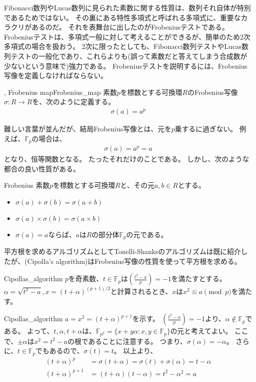 Fibonacci数列やLucas数列に見られた素数に関する性質は、数列それ自体が特別であるためではない。
その裏にある特性多項式と呼ばれる多項式に、重要なカラクリがあるのだ。
それを表舞台に出したのがFrobeniusテストである。
Frobeniusテストは、多項式一般に対して考えることができるが、簡単のため2次多項式の場合を扱おう。
2次に限ったとしても、Fibonacci数列テストやLucas数列テストの一般化であり、これらよりも(誤って素数だと答えてしまう合成数が少ないという意味で)強力である。
Frobeniusテストを説明するには、Frobenius写像を定義しなければならない。

\begin{Defi}{, Frobenius map}{Frobenius_map}
素数$p$を標数とする可換環$R$のFrobenius写像$\sigma:R\to R$を、次のように定義する。
\begin{align*}
\sigma(a) = a^p
\end{align*}
\end{Defi}

難しい言葉が並んだが、結局Frobenius写像とは、元を$p$乗するに過ぎない。
例えば、$\mathbb{F}_p$の場合は、
\begin{align*}
\sigma(a) = a^p = a
\end{align*}
となり、恒等関数となる。
たったそれだけのことである。
しかし、次のような都合の良い性質がある。

\begin{Prop}{}{Frobenius}
素数$p$を標数とする可換環$R$と、その元$a,b\in R$とする。
\begin{itemize}
\item $\sigma(a) + \sigma(b) = \sigma(a + b)$
\item $\sigma(a) \times \sigma(b) = \sigma(a \times b)$
\item $\sigma(a) = a$ならば、$a$は$R$の部分体$\mathbb{F}_p$の元である。
\end{itemize}
\end{Prop}

平方根を求めるアルゴリズムとしてTonelli-Shanksのアルゴリズムは既に紹介したが、(Cipolla's algorithm)はFrobenius写像の性質を使って平方根を求める。

\begin{Prop}{}{Cipollas_algorithm}
$p$を奇素数、$t\in\mathbb{F}_p$は$\left(\frac{t^2-a}{p}\right)=-1$を満たすとする。
$\alpha=\sqrt{t^2-a}, x=(t+\alpha)^{(p+1)/2}$と計算されるとき、$x$は$x^2 \equiv a\pmod{p}$を満たす。
\end{Prop}

\begin{prProof}{Cipollas_algorithm}
$a=x^2=(t+\alpha)^{p+1}$を示す。
$\left(\frac{t^2-a}{p}\right)=-1$より、$\alpha\not\in\mathbb{F}_p$である。
よって、$t,\alpha,t+\alpha$は、$\mathbb{F}_{p^2}=\{x+y\alpha : x,y \in\mathbb{F}_p\}$の元と考えてよい。
ここで、$\pm\alpha$は$x^2=t^2-a$の根であることに注意する。
つまり、$\sigma(\alpha)=-\alpha$。
さらに、$t\in\mathbb{F}_p$でもあるので、$\sigma(t)=t$。
以上より、
\begin{align*}
(t+\alpha)^p &= \sigma(t + \alpha) = \sigma(t) + \sigma(\alpha) = t - \alpha\\
(t+\alpha)^{p+1} &= (t+\alpha)(t-\alpha) = t^2 - \alpha^2 = a
\end{align*}
\end{prProof}

